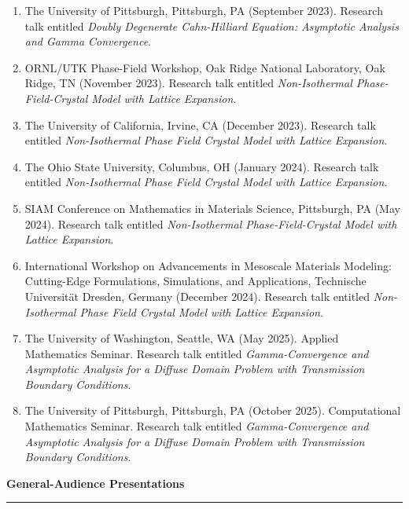 \documentclass[10pt,letterpaper]{article}
\newcommand{\cvsection}[1]{%
  \Needspace{5\baselineskip}\par\vspace{13pt}%
  {\color{Smokey}\fontsize{15}{17}\selectfont\bfseries #1}\par\vspace{3pt}%
  {\color{UTOrange}\rule{\linewidth}{1.8pt}}\par\vspace{4pt}%
}
\begin{document}
\begin{enumerate}
	\item
The University of Pittsburgh, Pittsburgh, PA (September 2023).  Research talk entitled {\sl Doubly Degenerate Cahn-Hilliard Equation: Asymptotic Analysis and Gamma Convergence}.

	\item
ORNL/UTK Phase-Field Workshop, Oak Ridge National Laboratory, Oak Ridge, TN (November 2023). Research talk entitled {\sl Non-Isothermal Phase-Field-Crystal Model with Lattice Expansion}.

	\item
The University of California, Irvine, CA (December 2023).  Research talk entitled {\sl Non-Isothermal Phase Field Crystal Model with Lattice Expansion}.

	\item
The Ohio State University, Columbus, OH (January 2024).  Research talk entitled {\sl Non-Isothermal Phase Field Crystal Model with Lattice Expansion}.

	\item
SIAM Conference on Mathematics in Materials Science, Pittsburgh, PA (May 2024). Research talk entitled {\sl Non-Isothermal Phase-Field-Crystal Model with Lattice Expansion}.

	\item
International Workshop on Advancements in Mesoscale Materials Modeling: Cutting-Edge Formulations, Simulations, and Applications, Technische Universit\"{a}t Dresden, Germany (December 2024). Research talk entitled {\sl Non-Isothermal Phase Field Crystal Model with Lattice Expansion}.

	\item
The University of Washington, Seattle, WA (May 2025). Applied Mathematics Seminar. Research talk entitled {\sl Gamma-Convergence and Asymptotic Analysis for a Diffuse Domain Problem with Transmission Boundary Conditions}.

	\item
The University of Pittsburgh, Pittsburgh, PA (October 2025). Computational Mathematics Seminar. Research talk entitled {\sl Gamma-Convergence and Asymptotic Analysis for a Diffuse Domain Problem with Transmission Boundary Conditions}.


	\end{enumerate}

	\smallskip

\cvsection{General-Audience Presentations}
\end{document}
